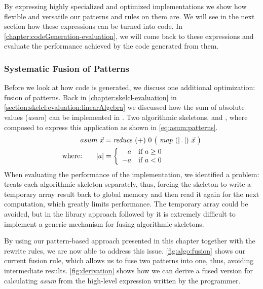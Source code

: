 By expressing highly specialized and optimized implementations we show how flexible and versatile our patterns and rules on them are.
We will see in the next section how these expressions can be turned into \OpenCL code.
In \autoref{chapter:codeGeneration-evaluation}, we will come back to these expressions and evaluate the performance achieved by the \OpenCL code generated from them.



















\subsubsection{Systematic Fusion of Patterns}
Before we look at how \OpenCL code is generated, we discuss one additional optimization: fusion of patterns.
Back in \autoref{chapter:skelcl-evaluation} in \autoref{section:skelcl:evaluation:linearAlgebra} we discussed how the sum of absolute values (\emph{asum}) can be implemented in \SkelCL.
Two algorithmic skeletons, \reduce and \map, where composed to express this application as shown in \autoref{eq:asum:patterns}.
\begin{align}
  asum\ \vec{x} &= \reduce\ (+)\ 0\ \big(\ \map\ (|\, .\, |)\ \vec{x}\ \big)\label{eq:asum:patterns}\\
  \text{where:} \qquad | a | &=
    \left\{
      \begin{array}{r l}
      a & \text{if } a \geq 0\\
      -a & \text{if } a < 0
      \end{array}
    \right.\nonumber
\end{align}
%
When evaluating the performance of the \SkelCL implementation, we identified a problem:
\SkelCL treats each algorithmic skeleton separately, thus, forcing the \map skeleton to write a temporary array result back to global memory and then read it again for the next computation, which greatly limits performance.
The temporary array could be avoided, but in the library approach followed by \SkelCL it is extremely difficult to implement a generic mechanism for fusing algorithmic skeletons.


By using our pattern-based approach presented in this chapter together with the rewrite rules, we are now able to address this issue.
\autoref{fig:algo:fusion} shows our current fusion rule, which allows us to fuse two patterns into one, thus, avoiding intermediate results.
\autoref{fig:derivation} shows how we can derive a fused version for calculating \emph{asum} from the high-level expression written by the programmer.

